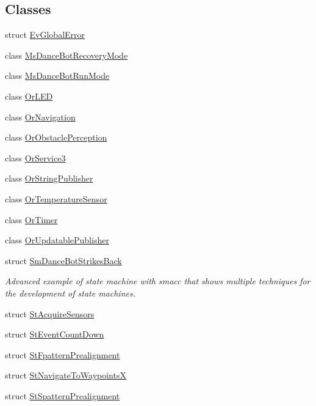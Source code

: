 \subsection*{Classes}
\begin{DoxyCompactItemize}
\item 
struct \hyperlink{structsm__dance__bot__strikes__back_1_1EvGlobalError}{Ev\+Global\+Error}
\item 
class \hyperlink{classsm__dance__bot__strikes__back_1_1MsDanceBotRecoveryMode}{Ms\+Dance\+Bot\+Recovery\+Mode}
\item 
class \hyperlink{classsm__dance__bot__strikes__back_1_1MsDanceBotRunMode}{Ms\+Dance\+Bot\+Run\+Mode}
\item 
class \hyperlink{classsm__dance__bot__strikes__back_1_1OrLED}{Or\+L\+ED}
\item 
class \hyperlink{classsm__dance__bot__strikes__back_1_1OrNavigation}{Or\+Navigation}
\item 
class \hyperlink{classsm__dance__bot__strikes__back_1_1OrObstaclePerception}{Or\+Obstacle\+Perception}
\item 
class \hyperlink{classsm__dance__bot__strikes__back_1_1OrService3}{Or\+Service3}
\item 
class \hyperlink{classsm__dance__bot__strikes__back_1_1OrStringPublisher}{Or\+String\+Publisher}
\item 
class \hyperlink{classsm__dance__bot__strikes__back_1_1OrTemperatureSensor}{Or\+Temperature\+Sensor}
\item 
class \hyperlink{classsm__dance__bot__strikes__back_1_1OrTimer}{Or\+Timer}
\item 
class \hyperlink{classsm__dance__bot__strikes__back_1_1OrUpdatablePublisher}{Or\+Updatable\+Publisher}
\item 
struct \hyperlink{structsm__dance__bot__strikes__back_1_1SmDanceBotStrikesBack}{Sm\+Dance\+Bot\+Strikes\+Back}
\begin{DoxyCompactList}\small\item\em Advanced example of state machine with smacc that shows multiple techniques for the development of state machines. \end{DoxyCompactList}\item 
struct \hyperlink{structsm__dance__bot__strikes__back_1_1StAcquireSensors}{St\+Acquire\+Sensors}
\item 
struct \hyperlink{structsm__dance__bot__strikes__back_1_1StEventCountDown}{St\+Event\+Count\+Down}
\item 
struct \hyperlink{structsm__dance__bot__strikes__back_1_1StFpatternPrealignment}{St\+Fpattern\+Prealignment}
\item 
struct \hyperlink{structsm__dance__bot__strikes__back_1_1StNavigateToWaypointsX}{St\+Navigate\+To\+WaypointsX}
\item 
struct \hyperlink{structsm__dance__bot__strikes__back_1_1StSpatternPrealignment}{St\+Spattern\+Prealignment}
\end{DoxyCompactItemize}
